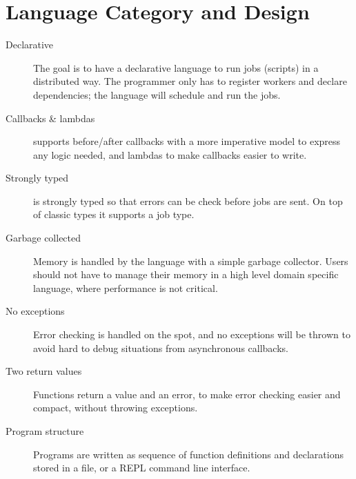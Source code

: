 \section{Language Category and Design}
\label{sect:desg}
\begin{description}
\item[Declarative] The goal is to have a declarative language to run jobs
(scripts) in a distributed way. The programmer only has to register workers and
declare dependencies; the language will schedule and run the jobs.
\item[Callbacks \& lambdas] \lang{} supports before/after callbacks
with a more imperative model to express any logic needed, and
lambdas to make callbacks easier to write.
\item[Strongly typed] \lang{} is strongly typed so that errors can be check
before jobs are sent. On top of classic types it supports a job type.
\item[Garbage collected] Memory is handled by the language with a simple
garbage collector. Users should not have to manage their memory in a high
level domain specific language, where performance is not critical.
\item[No exceptions] Error checking is handled on the spot, and no exceptions
will be thrown to avoid hard to debug situations from asynchronous callbacks.
\item[Two return values] Functions return a value and an error, to make error
checking easier and compact, without throwing exceptions.
\item[Program structure] Programs are written as sequence of function
definitions and declarations stored in a file, or a REPL command line
interface.
\end{description}
